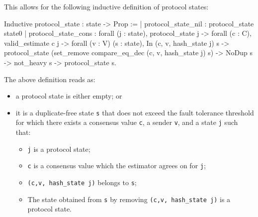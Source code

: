 This allows for the following inductive definition of protocol states:

\begin{coq}
Inductive protocol_state : state -> Prop :=
| protocol_state_nil : protocol_state state0
| protocol_state_cons : forall (j : state),
    protocol_state j ->
    forall (c : C),
      valid_estimate c j ->
      forall (v : V) (s : state),
        In (c, v, hash_state j) s ->
        protocol_state (set_remove compare_eq_dec
        													(c, v, hash_state j) s) ->
        NoDup s ->
        not_heavy s ->
        protocol_state s.
\end{coq}

The above definition reads as:
\begin{itemize}
    \item a protocol state is either empty; or
    \item it is a duplicate-free state \verb|s| that does not exceed the fault tolerance threshold for which
        there exists a consensus value \verb|c|, a sender \verb|v|, and a state \verb|j| such that:
        \begin{itemize}
            \item \verb|j| is a protocol state;
            \item \verb|c| is a consensus value which the estimator agrees on for \verb|j|;
            \item \verb|(c,v, hash_state j)| belongs to \verb|s|;
            \item The state obtained from \verb|s| by removing
                \verb|(c,v, hash_state j)| is a protocol state.
        \end{itemize}
\end{itemize}